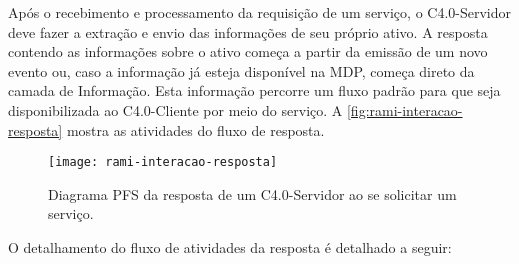 Após o recebimento e processamento da requisição de um serviço, o C4.0-Servidor deve fazer a extração e envio das informações de seu próprio ativo. A resposta contendo as informações sobre o ativo começa a partir da emissão de um novo evento ou, caso a informação já esteja disponível na MDP, começa direto da camada de Informação. Esta informação percorre um fluxo padrão para que seja disponibilizada ao C4.0-Cliente por meio do serviço. A \autoref{fig:rami-interacao-resposta} mostra as atividades do fluxo de resposta.

\begin{figure}[htb]
	\centering
	\texttt{[image: rami-interacao-resposta]}
	\caption{Diagrama PFS da resposta de um C4.0-Servidor ao se solicitar um serviço.}
	\label{fig:rami-interacao-resposta}
\end{figure}

O detalhamento do fluxo de atividades da resposta é detalhado a seguir:

